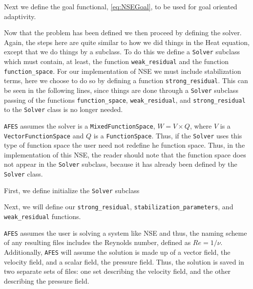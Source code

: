     Next we define the goal functional, \eqref{eq:NSEGoal}, to be used for goal
    oriented adaptivity.
    

    Now that the problem has been defined we then proceed by defining the
    solver. Again, the steps here are quite similar to how we did things in the
    Heat equation, except that we do things by a subclass.  To do this we define
    a \texttt{Solver} subclass which must contain, at least, the function
    \texttt{weak\_residual} and the function \texttt{function\_space}. For our
    implementation of NSE we must include stabilization terms, here we choose to
    do so by defining a function \texttt{strong\_residual}.  This can be seen in
    the following lines, since things are done through a \texttt{Solver}
    subclass passing of the functions \texttt{function\_space},
    \texttt{weak\_residual}, and \texttt{strong\_residual} to the
    \texttt{Solver} class is no longer needed.

    \begin{remark}
        \texttt{AFES} assumes the solver is a \texttt{MixedFunctionSpace}, $W =
        V \times Q$, where $V$ is a \texttt{VectorFunctionSpace} and $Q$ is a
        \texttt{FunctionSpace}. Thus, if the \texttt{Solver} uses this type of
        function space the user need not redefine he function space. Thus, in
        the implementation of this NSE, the reader should note that the function
        space does not appear in the \texttt{Solver} subclass, because it has
        already been defined by the \texttt{Solver} class.
    \end{remark}

    First, we define initialize the \texttt{Solver} subclass
    

    Next, we will define our \texttt{strong\_residual},
    \texttt{stabilization\_parameters}, and \texttt{weak\_residual} functions.
    

    \begin{remark}
        \texttt{AFES} assumes the user is solving a system like NSE and thus,
        the naming scheme of any resulting files includes the Reynolds number,
        defined as $Re=1/\nu$. Additionally, \texttt{AFES} will assume the
        solution is made up of a vector field, the velocity field, and a
        scalar field, the pressure field. Thus, the solution is saved in two
        separate sets of files: one set describing the velocity field, and the
        other describing the pressure field.
    \end{remark}

